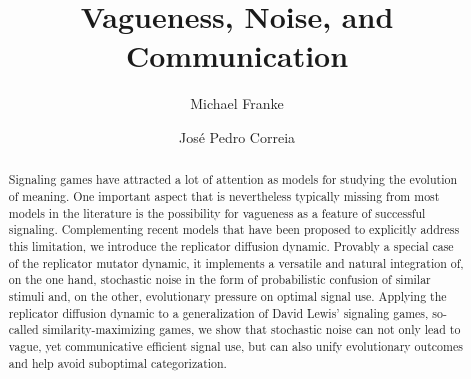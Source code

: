 \documentclass[fleqn,reqno,10pt]{article}
\title{Vagueness, Noise, and Communication}
\author{Michael Franke \and Jos\'e Pedro Correia}
\date{}
\begin{document}
\maketitle

\begin{abstract}
  Signaling games have attracted a lot of attention as models for
  studying the evolution of meaning. One important aspect that is
  nevertheless typically missing from most models in the literature is
  the possibility for vagueness as a feature of successful signaling.
  Complementing recent models that have been proposed to explicitly
  address this limitation, we introduce the replicator diffusion
  dynamic. Provably a special case of the replicator mutator dynamic,
  it implements a versatile and natural integration of, on the one hand, stochastic
  noise in the form of probabilistic confusion of similar stimuli and, on
  the other, evolutionary pressure on optimal signal use.
  Applying the replicator diffusion dynamic to a
  generalization of David Lewis' signaling games, so-called
  similarity-maximizing games, we show that stochastic noise can not
  only lead to vague, yet communicative efficient signal use, but can
  also unify evolutionary outcomes and help avoid suboptimal
  categorization.
\end{abstract}














\printbibliography[heading=bibintoc]
\end{document}
